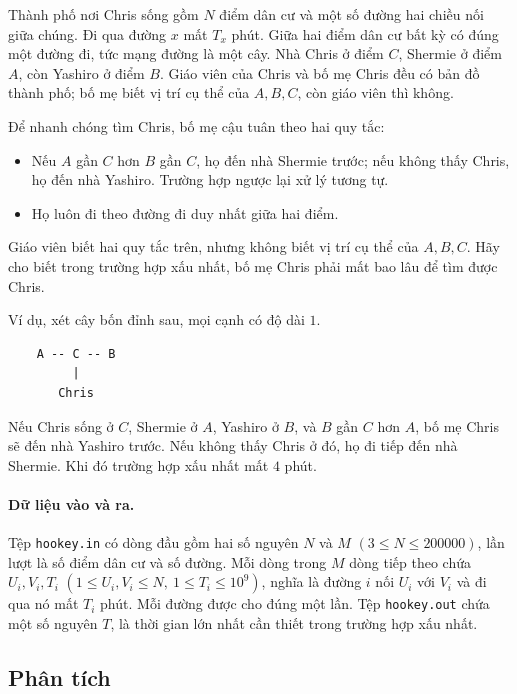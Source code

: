 \documentclass[11pt]{article}
\begin{document}
Thành phố nơi Chris sống gồm \(N\) điểm dân cư và một số đường hai chiều nối
giữa chúng. Đi qua đường \(x\) mất \(T_x\) phút. Giữa hai điểm dân cư bất kỳ
có đúng một đường đi, tức mạng đường là một cây. Nhà Chris ở điểm \(C\),
Shermie ở điểm \(A\), còn Yashiro ở điểm \(B\). Giáo viên của Chris và bố mẹ
Chris đều có bản đồ thành phố; bố mẹ biết vị trí cụ thể của \(A,B,C\), còn
giáo viên thì không.

Để nhanh chóng tìm Chris, bố mẹ cậu tuân theo hai quy tắc:
\begin{itemize}
  \item Nếu \(A\) gần \(C\) hơn \(B\) gần \(C\), họ đến nhà Shermie trước; nếu
  không thấy Chris, họ đến nhà Yashiro. Trường hợp ngược lại xử lý tương tự.
  \item Họ luôn đi theo đường đi duy nhất giữa hai điểm.
\end{itemize}

Giáo viên biết hai quy tắc trên, nhưng không biết vị trí cụ thể của
\(A,B,C\). Hãy cho biết trong trường hợp xấu nhất, bố mẹ Chris phải mất bao
lâu để tìm được Chris.

Ví dụ, xét cây bốn đỉnh sau, mọi cạnh có độ dài \(1\).

\begin{verbatim}
    A -- C -- B
         |
       Chris
\end{verbatim}

Nếu Chris sống ở \(C\), Shermie ở \(A\), Yashiro ở \(B\), và \(B\) gần \(C\)
hơn \(A\), bố mẹ Chris sẽ đến nhà Yashiro trước. Nếu không thấy Chris ở đó,
họ đi tiếp đến nhà Shermie. Khi đó trường hợp xấu nhất mất \(4\) phút.

\paragraph{Dữ liệu vào và ra.}
Tệp \texttt{hookey.in} có dòng đầu gồm hai số nguyên \(N\) và \(M\)
\((3\le N\le 200000)\), lần lượt là số điểm dân cư và số đường. Mỗi dòng
trong \(M\) dòng tiếp theo chứa \(U_i,V_i,T_i\)
\((1\le U_i,V_i\le N,\ 1\le T_i\le 10^9)\), nghĩa là đường \(i\) nối
\(U_i\) với \(V_i\) và đi qua nó mất \(T_i\) phút. Mỗi đường được cho đúng
một lần. Tệp \texttt{hookey.out} chứa một số nguyên \(T\), là thời gian lớn
nhất cần thiết trong trường hợp xấu nhất.

\subsection{Phân tích}
\end{document}
